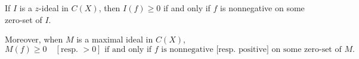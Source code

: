 If $I$ is a $z$-ideal in $C(X)$, then $I(f) \geq 0$ if and only if $f$ is nonnegative on some zero-set of $I$.

Moreover, when $M$ is a maximal ideal in $C(X)$,
$$
M(f) \geq 0 \quad [\text{resp. } > 0] \text{ if and only if } f \text{ is nonnegative [resp. positive] on some zero-set of } M.
$$
